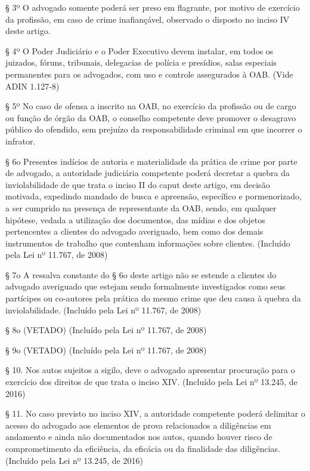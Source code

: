 \documentclass[12pt]{article}
\begin{document}
§ 3º O advogado somente poderá ser preso em flagrante, por motivo de exercício da profissão, em caso de crime inafiançável, observado o disposto no inciso IV deste artigo.

§ 4º O Poder Judiciário e o Poder Executivo devem instalar, em todos os juizados, fóruns, tribunais, delegacias de polícia e presídios, salas especiais permanentes para os advogados, com uso e controle assegurados à OAB.     (Vide ADIN 1.127-8)

§ 5º No caso de ofensa a inscrito na OAB, no exercício da profissão ou de cargo ou função de órgão da OAB, o conselho competente deve promover o desagravo público do ofendido, sem prejuízo da responsabilidade criminal em que incorrer o infrator.

§ 6o  Presentes indícios de autoria e materialidade da prática de crime por parte de advogado, a autoridade judiciária competente poderá decretar a quebra da inviolabilidade de que trata o inciso II do caput deste artigo, em decisão motivada, expedindo mandado de busca e apreensão, específico e pormenorizado, a ser cumprido na presença de representante da OAB, sendo, em qualquer hipótese, vedada a utilização dos documentos, das mídias e dos objetos pertencentes a clientes do advogado averiguado, bem como dos demais instrumentos de trabalho que contenham informações sobre clientes.       (Incluído pela Lei nº 11.767, de 2008)

§ 7o  A ressalva constante do § 6o deste artigo não se estende a clientes do advogado averiguado que estejam sendo formalmente investigados como seus partícipes ou co-autores pela prática do mesmo crime que deu causa à quebra da inviolabilidade.       (Incluído pela Lei nº 11.767, de 2008)

§ 8o  (VETADO)       (Incluído pela Lei nº 11.767, de 2008)

§ 9o  (VETADO)       (Incluído pela Lei nº 11.767, de 2008)

§ 10.  Nos autos sujeitos a sigilo, deve o advogado apresentar procuração para o exercício dos direitos de que trata o inciso XIV.          (Incluído pela Lei nº 13.245, de 2016)

§ 11.  No caso previsto no inciso XIV, a autoridade competente poderá delimitar o acesso do advogado aos elementos de prova relacionados a diligências em andamento e ainda não documentados nos autos, quando houver risco de comprometimento da eficiência, da eficácia ou da finalidade das diligências.          (Incluído pela Lei nº 13.245, de 2016)
\end{document}

